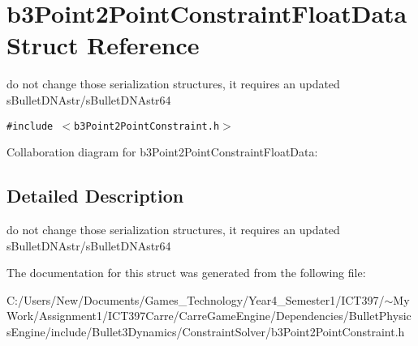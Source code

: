\hypertarget{structb3_point2_point_constraint_float_data}{
\section{b3Point2PointConstraintFloatData Struct Reference}
\label{structb3_point2_point_constraint_float_data}
}
do not change those serialization structures, it requires an updated sBulletDNAstr/sBulletDNAstr64  


{\tt \#include $<$b3Point2PointConstraint.h$>$}

Collaboration diagram for b3Point2PointConstraintFloatData:

\subsection{Detailed Description}
do not change those serialization structures, it requires an updated sBulletDNAstr/sBulletDNAstr64 

The documentation for this struct was generated from the following file:\begin{CompactItemize}
\item 
C:/Users/New/Documents/Games\_\-Technology/Year4\_\-Semester1/ICT397/$\sim$My Work/Assignment1/ICT397Carre/CarreGameEngine/Dependencies/BulletPhysicsEngine/include/Bullet3Dynamics/ConstraintSolver/b3Point2PointConstraint.h\end{CompactItemize}
